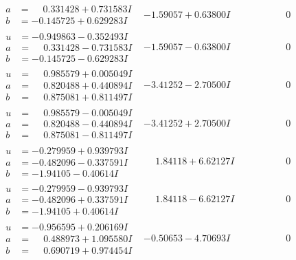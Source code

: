 \documentclass[1p]{elsarticle_modified}
\theoremstyle{definition}
\begin{document}
$$\begin{array}{c|c|c}
\begin{aligned}
a &= \phantom{-}0.331428 + 0.731583 I \\
b &= -0.145725 + 0.629283 I\end{aligned}
 & -1.59057 + 0.63800 I & \phantom{-0.000000 } 0 \\ \hline\begin{aligned}
u &= -0.949863 - 0.352493 I \\
a &= \phantom{-}0.331428 - 0.731583 I \\
b &= -0.145725 - 0.629283 I\end{aligned}
 & -1.59057 - 0.63800 I & \phantom{-0.000000 } 0 \\ \hline\begin{aligned}
u &= \phantom{-}0.985579 + 0.005049 I \\
a &= \phantom{-}0.820488 + 0.440894 I \\
b &= \phantom{-}0.875081 + 0.811497 I\end{aligned}
 & -3.41252 - 2.70500 I & \phantom{-0.000000 } 0 \\ \hline\begin{aligned}
u &= \phantom{-}0.985579 - 0.005049 I \\
a &= \phantom{-}0.820488 - 0.440894 I \\
b &= \phantom{-}0.875081 - 0.811497 I\end{aligned}
 & -3.41252 + 2.70500 I & \phantom{-0.000000 } 0 \\ \hline\begin{aligned}
u &= -0.279959 + 0.939793 I \\
a &= -0.482096 - 0.337591 I \\
b &= -1.94105 - 0.40614 I\end{aligned}
 & \phantom{-}1.84118 + 6.62127 I & \phantom{-0.000000 } 0 \\ \hline\begin{aligned}
u &= -0.279959 - 0.939793 I \\
a &= -0.482096 + 0.337591 I \\
b &= -1.94105 + 0.40614 I\end{aligned}
 & \phantom{-}1.84118 - 6.62127 I & \phantom{-0.000000 } 0 \\ \hline\begin{aligned}
u &= -0.956595 + 0.206169 I \\
a &= \phantom{-}0.488973 + 1.095580 I \\
b &= \phantom{-}0.690719 + 0.974454 I\end{aligned}
 & -0.50653 - 4.70693 I & \phantom{-0.000000 } 0 \\ \hline\begin{aligned}

\end{aligned}
\end{array}$$
\end{document}
